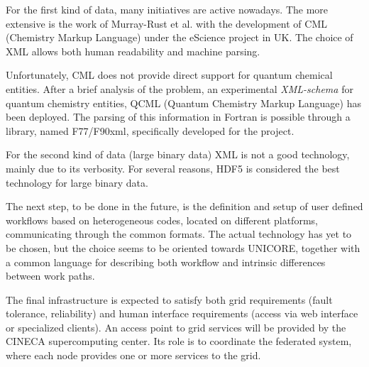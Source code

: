 For the first kind of data, many initiatives are active nowadays. The more
extensive is the work of Murray-Rust et al.\cite{jcics-39-928-1999,
jcics-41-1113-2001,jcics-41-1124-2001,cc-1471-2000,njc-618-2001} with the
development of CML (Chemistry Markup Language) under the eScience project in
UK. The choice of XML allows both human readability and machine parsing.

Unfortunately, CML does not provide direct support for quantum chemical
entities.  After a brief analysis of the problem, an experimental
\textit{XML-schema} for quantum chemistry entities, QCML (Quantum Chemistry
Markup Language) has been deployed. The parsing of this information in
Fortran is possible through a library, named F77/F90xml, specifically
developed for the project.

For the second kind of data (large binary data) XML is not a good
technology, mainly due to its verbosity. For several reasons,
HDF5\cite{hdf5-site} is considered the best technology for large binary
data.

The next step, to be done in the future, is the definition and setup of
user defined workflows based on heterogeneous codes, located on different
platforms, communicating through the common formats. The actual technology
has yet to be chosen, but the choice seems to be oriented towards
UNICORE\cite{streit-tbp-2005,erwin-unicore,unicore-site}, together with a
common language for describing both workflow and intrinsic differences
between work paths. 

The final infrastructure is expected to satisfy both grid requirements
(fault tolerance, reliability) and human interface requirements (access via
web interface or specialized clients). An access point to grid services will be provided by
the CINECA supercomputing center. Its role is to coordinate the federated
system, where each node provides one or more services to the grid.


